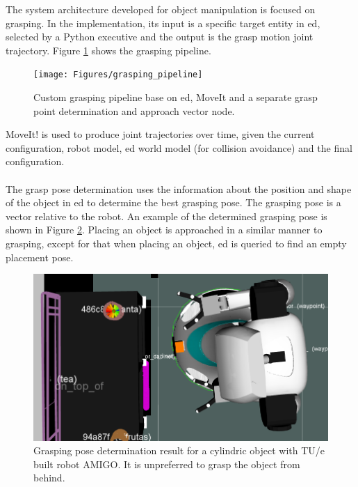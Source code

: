 The system architecture developed for object manipulation is focused on grasping. In the implementation, its input is a specific target entity in \acrshort{ed}, selected by a Python executive and the output is the grasp motion joint trajectory.
Figure \ref{fig:grasping_pipeline} shows the grasping pipeline.
\begin{figure}[H]
    \centering
	\texttt{[image: Figures/grasping\_pipeline]}
	\caption{Custom grasping pipeline base on \acrshort{ed}, MoveIt and a separate grasp point determination and approach vector node.}
	\label{fig:grasping_pipeline}
\end{figure}
MoveIt! is used to produce joint trajectories over time, given the current configuration, robot model, \acrshort{ed} world model (for collision avoidance) and the final configuration.
\\~\\
\indent The grasp pose determination uses the information about the position and shape of the object in \acrshort{ed} to determine the best grasping pose.
The grasping pose is a vector relative to the robot.
An example of the determined grasping pose is shown in Figure \ref{fig:grasping_pose_determination}.
Placing an object is approached in a similar manner to grasping, except for that when placing an object, \acrshort{ed} is queried to find an empty placement pose.
\begin{figure}[H]
   \centering
   \includegraphics[width = 0.8\linewidth]{Figures/grasp_point_determination}
	\caption{Grasping pose determination result for a cylindric object with TU/e built robot AMIGO. It is unpreferred to grasp the object from behind.}
	\label{fig:grasping_pose_determination}
\end{figure}
